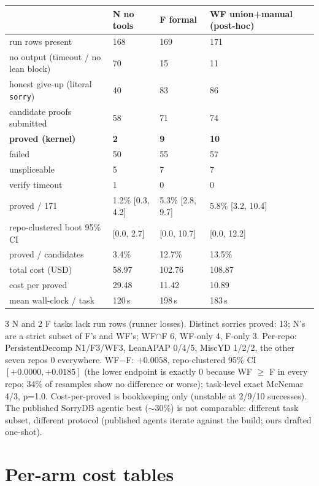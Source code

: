 \documentclass[10pt]{article}
\newcommand{\code}[1]{\texttt{#1}}
\newcommand{\best}[1]{\textbf{#1}}
\begin{document}
\begin{center}\footnotesize
\begin{tabular}{@{}llll@{}}
\toprule
 & N no tools & F formal & WF union+manual (post-hoc) \\
\midrule
run rows present & 168 & 169 & 171 \\
no output (timeout / no lean block) & 70 & 15 & 11 \\
honest give-up (literal \code{sorry}) & 40 & 83 & 86 \\
candidate proofs submitted & 58 & 71 & 74 \\
\textbf{proved (kernel)} & \best{2} & \best{9} & \best{10} \\
failed & 50 & 55 & 57 \\
unspliceable & 5 & 7 & 7 \\
verify timeout & 1 & 0 & 0 \\
proved / 171 & 1.2\% [0.3, 4.2] & 5.3\% [2.8, 9.7] & 5.8\% [3.2, 10.4] \\
repo-clustered boot 95\% CI & [0.0, 2.7] & [0.0, 10.7] & [0.0, 12.2] \\
proved / candidates & 3.4\% & 12.7\% & 13.5\% \\
total cost (USD) & 58.97 & 102.76 & 108.87 \\
cost per proved & 29.48 & 11.42 & 10.89 \\
mean wall-clock / task & 120\,s & 198\,s & 183\,s \\
\bottomrule
\end{tabular}
\end{center}

3 N and 2 F tasks lack run rows (runner losses). Distinct sorries
proved: 13; N's are a strict subset of F's and WF's; WF$\cap$F 6,
WF-only 4, F-only 3. Per-repo: PersistentDecomp N1/F3/WF3, LeanAPAP
0/4/5, MiscYD 1/2/2, the other seven repos 0 everywhere. WF$-$F:
$+0.0058$, repo-clustered 95\% CI $[+0.0000, +0.0185]$ (the lower
endpoint is exactly 0 because WF $\geq$ F in every repo; 34\% of
resamples show no difference or worse); task-level exact McNemar 4/3,
p=1.0. Cost-per-proved is bookkeeping only (unstable at 2/9/10
successes). The published SorryDB agentic best ($\sim$30\%) is not
comparable: different task subset, different protocol (published
agents iterate against the build; ours drafted one-shot).

\section{Per-arm cost tables}\label{s10}
\end{document}
